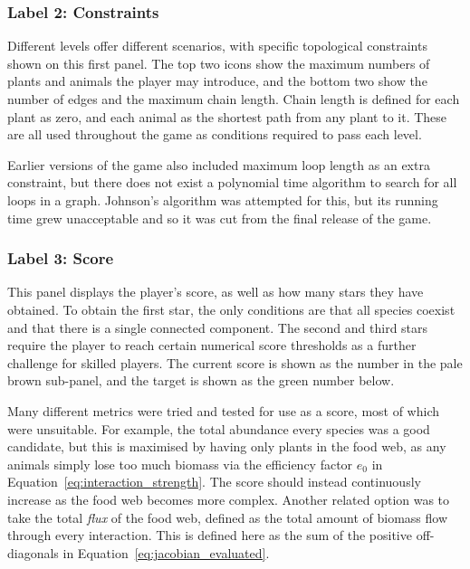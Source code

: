 \subsubsection{Label 2: Constraints}
Different levels offer different scenarios, with specific topological constraints shown on this first panel. The top two icons show the maximum numbers of plants and animals the player may introduce, and the bottom two show the number of edges and the maximum chain length. Chain length is defined for each plant as zero, and each animal as the shortest path from any plant to it. These are all used throughout the game as conditions required to pass each level.

Earlier versions of the game also included maximum loop length as an extra constraint, but there does not exist a polynomial time algorithm to search for all loops in a graph. Johnson's algorithm \cite{Johnson1975} was attempted for this, but its running time grew unacceptable and so it was cut from the final release of the game.

\subsubsection{Label 3: Score}
This panel displays the player's score, as well as how many stars they have obtained. To obtain the first star, the only conditions are that all species coexist and that there is a single connected component. The second and third stars require the player to reach certain numerical score thresholds as a further challenge for skilled players. The current score is shown as the number in the pale brown sub-panel, and the target is shown as the green number below.

Many different metrics were tried and tested for use as a score, most of which were unsuitable. For example, the total abundance every species was a good candidate, but this is maximised by having only plants in the food web, as any animals simply lose too much biomass via the efficiency factor $e_0$ in Equation~\eqref{eq:interaction_strength}. The score should instead continuously increase as the food web becomes more complex. Another related option was to take the total \emph{flux} of the food web, defined as the total amount of biomass flow through every interaction. This is defined here as the sum of the positive off-diagonals in Equation~\eqref{eq:jacobian_evaluated}.

